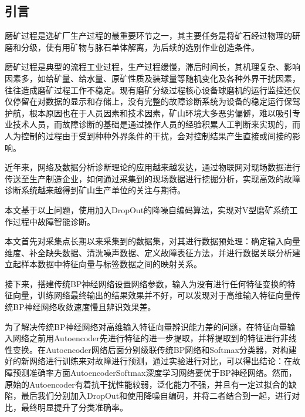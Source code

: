 \documentclass{ctacn}%
\begin{document}


\maketitle




\begin{multicols}{2}
\section{引\quad 言}
磨矿过程是选矿厂生产过程的最重要环节之一，其主要任务是将矿石经过物理的研磨和分级，使有用矿物与脉石单体解离，为后续的选别作业创造条件。

磨矿过程是典型的流程工业过程，生产过程缓慢，滞后时间长，其机理复杂、影响因素多，如给矿量、给水量、原矿性质及装球量等随机变化及各种外界干扰因素，往往造成磨矿过程工作不稳定。现有磨矿分级过程核心设备球磨机的运行监控还仅仅停留在对数据的显示和存储上，没有完整的故障诊断系统为设备的稳定运行保驾护航，根本原因也在于人员因素和技术因素，矿山环境大多恶劣偏僻，难以吸引专业技术人员，而故障诊断的基础是通过操作人员的经验积累人工判断来实现的，而人为控制的过程由于受到种种外界条件的干扰，会对控制结果产生直接或间接的影响。

近年来，网络及数据分析诊断理论的应用越来越发达，通过物联网对现场数据进行传送至生产制造企业，如何通过采集到的现场数据进行挖掘分析，实现高效的故障诊断系统越来越得到矿山生产单位的关注与期待。

本文基于以上问题，使用加入DropOut的降噪自编码算法，实现对V型磨矿系统工作过程中故障智能诊断。

本文首先对采集点长期以来采集到的数据集，对其进行数据预处理：确定输入向量维度、补全缺失数据、清洗噪声数据、定义故障表征方法，并进行数据关联分析建立起样本数据中特征向量与标签数据之间的映射关系。

接下来，搭建传统BP神经网络设置网络参数，输入为没有进行任何特征变换的特征向量，训练网络最终输出的结果效果并不好，可以发现对于高维输入特征向量传统BP神经网络收敛速度慢且辨识效果差。

为了解决传统BP神经网络对高维输入特征向量辨识能力差的问题，在特征向量输入网络之前用Autoencoder先进行特征的进一步提取，并将提取到的特征进行非线性变换。在Autoencoder网络后面分别级联传统BP网络和Softmax分类器，对构建好的新网络进行训练来对故障进行预测，通过实验进行对比，可以得出结论：在故障预测准确率方面AutoencoderSoftmax深度学习网络要优于BP神经网络。然而，原始的Autoencoder有着抗干扰性能较弱，泛化能力不强，并且有一定过拟合的缺陷，最后我们分别加入DropOut和使用降噪自编码，并将二者结合到一起，进行对比，最终明显提升了分类准确率。


\end{multicols}
\end{document}
